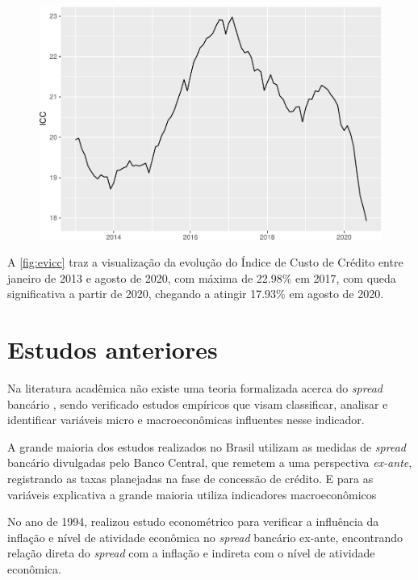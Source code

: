 \documentclass[12pt,openright,oneside,a4paper,chapter=TITLE,section=TITLE,subsection=Title,english,french,spanish,portugues,sumario=tradicional]{04-class-files/abntex2}
\begin{document}
\begin{figure}

\begin{center}\includegraphics{12-exportedfigures/ICC-1} \end{center}
\label{fig:evicc}
\end{figure}

A \autoref{fig:evicc} traz a visualização da evolução do Índice de Custo de Crédito entre janeiro de 2013 e agosto de 2020, com máxima de 22.98\% em 2017, com queda significativa a partir de 2020, chegando a atingir 17.93\% em agosto de 2020.

\section{Estudos anteriores}

Na literatura acadêmica não existe uma teoria formalizada acerca do \emph{spread} bancário \cite{timotio:2018}, sendo verificado estudos empíricos que visam classificar, analisar e identificar variáveis micro e macroeconômicas influentes nesse indicador.

A grande maioria dos estudos realizados no Brasil utilizam as medidas de \emph{spread} bancário divulgadas pelo Banco Central, que remetem a uma perspectiva \emph{ex-ante}, registrando as taxas planejadas na fase de concessão de crédito. E para as variáveis explicativa a grande maioria utiliza indicadores macroeconômicos \cite{dantas:2012}

No ano de 1994, \textcite{aronovich:1994} realizou estudo econométrico para verificar a influência da inflação e nível de atividade econômica no \emph{spread} bancário ex-ante, encontrando relação direta do \emph{spread} com a inflação e indireta com o nível de atividade econômica.
\end{document}
